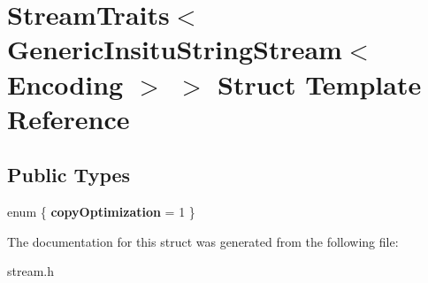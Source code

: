 \hypertarget{a02424}{}\section{Stream\+Traits$<$ Generic\+Insitu\+String\+Stream$<$ Encoding $>$ $>$ Struct Template Reference}
\label{a02424}
\subsection*{Public Types}
\begin{DoxyCompactItemize}
\item 
\mbox{\label{a02424_a4d3f346ea93c1397e3a995d38fdae4f6}} 
enum \{ {\bfseries copy\+Optimization} = 1
 \}
\end{DoxyCompactItemize}


The documentation for this struct was generated from the following file\+:\begin{DoxyCompactItemize}
\item 
stream.\+h\end{DoxyCompactItemize}
